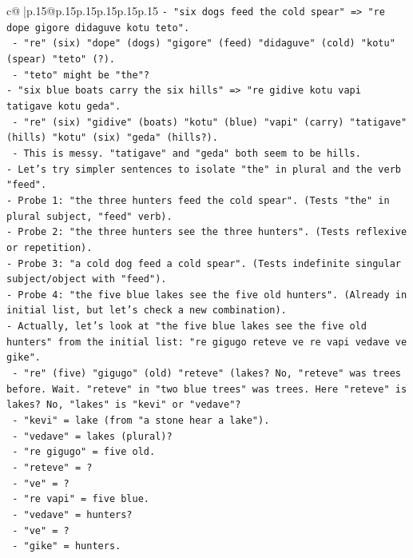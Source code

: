 \documentclass{article}
\begin{document}
{\begin{supertabular}{c@{$\;$}|p{.15\linewidth}@{}p{.15\linewidth}p{.15\linewidth}p{.15\linewidth}p{.15\linewidth}p{.15\linewidth}}
{{{\texttt{{-} "six dogs feed the cold spear" => "re dope gigore didaguve kotu teto".} \\
\texttt{  {-} "re" (six) "dope" (dogs) "gigore" (feed) "didaguve" (cold) "kotu" (spear) "teto" (?).} \\
\texttt{  {-} "teto" might be "the"?} \\
\texttt{{-} "six blue boats carry the six hills" => "re gidive kotu vapi tatigave kotu geda".} \\
\texttt{  {-} "re" (six) "gidive" (boats) "kotu" (blue) "vapi" (carry) "tatigave" (hills) "kotu" (six) "geda" (hills?).} \\
\texttt{  {-} This is messy. "tatigave" and "geda" both seem to be hills.} \\
\texttt{{-} Let's try simpler sentences to isolate "the" in plural and the verb "feed".} \\
\texttt{{-} Probe 1: "the three hunters feed the cold spear". (Tests "the" in plural subject, "feed" verb).} \\
\texttt{{-} Probe 2: "the three hunters see the three hunters". (Tests reflexive or repetition).} \\
\texttt{{-} Probe 3: "a cold dog feed a cold spear". (Tests indefinite singular subject/object with "feed").} \\
\texttt{{-} Probe 4: "the five blue lakes see the five old hunters". (Already in initial list, but let's check a new combination).} \\
\texttt{{-} Actually, let's look at "the five blue lakes see the five old hunters" from the initial list: "re gigugo reteve ve re vapi vedave ve gike".} \\
\texttt{  {-} "re" (five) "gigugo" (old) "reteve" (lakes? No, "reteve" was trees before. Wait. "reteve" in "two blue trees" was trees. Here "reteve" is lakes? No, "lakes" is "kevi" or "vedave"?} \\
\texttt{  {-} "kevi" = lake (from "a stone hear a lake").} \\
\texttt{  {-} "vedave" = lakes (plural)?} \\
\texttt{  {-} "re gigugo" = five old.} \\
\texttt{  {-} "reteve" = ?} \\
\texttt{  {-} "ve" = ?} \\
\texttt{  {-} "re vapi" = five blue.} \\
\texttt{  {-} "vedave" = hunters?} \\
\texttt{  {-} "ve" = ?} \\
\texttt{  {-} "gike" = hunters.} \\
}}}
\end{supertabular}}
\end{document}
